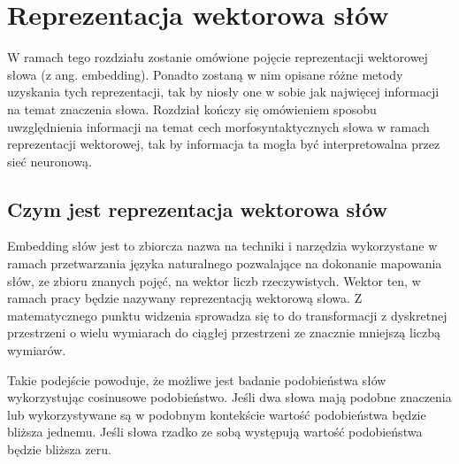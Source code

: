 \newpage %
\section{\label{embeddings}Reprezentacja wektorowa słów}

W ramach tego rozdziału zostanie omówione pojęcie reprezentacji wektorowej słowa (z ang. embedding). Ponadto zostaną w nim opisane różne metody uzyskania tych reprezentacji, tak by niosły one w sobie jak najwięcej informacji na temat znaczenia słowa. Rozdział kończy się omówieniem sposobu uwzględnienia informacji na temat cech morfosyntaktycznych słowa w ramach reprezentacji wektorowej, tak by informacja ta mogła być interpretowalna przez sieć neuronową. 

\subsection{Czym jest reprezentacja wektorowa słów}





Embedding słów jest to zbiorcza nazwa na techniki i narzędzia wykorzystane w ramach przetwarzania języka naturalnego pozwalające na dokonanie mapowania słów, ze zbioru znanych pojęć, na wektor liczb rzeczywistych. Wektor ten, w ramach pracy będzie nazywany reprezentacją wektorową słowa. Z matematycznego punktu widzenia sprowadza się to do transformacji z dyskretnej przestrzeni o wielu wymiarach do ciągłej przestrzeni ze znacznie mniejszą liczbą wymiarów. \cite{Emb_def}



Takie podejście powoduje, że możliwe jest badanie podobieństwa słów wykorzystując cosinusowe podobieństwo. Jeśli dwa słowa mają podobne znaczenia lub wykorzystywane są w podobnym kontekście  wartość podobieństwa będzie bliższa jednemu. Jeśli słowa rzadko ze sobą występują wartość podobieństwa będzie bliższa zeru.  \cite{Cooos_def}

